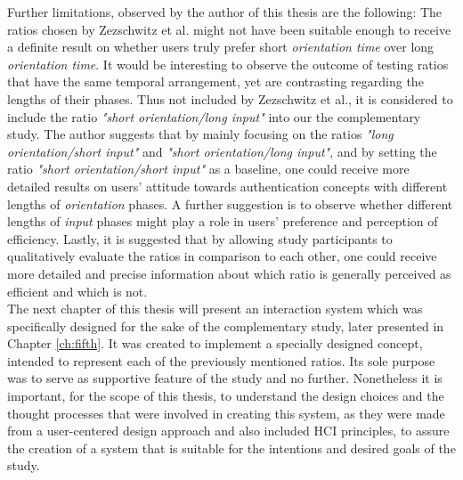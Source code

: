 Further limitations, observed by the author of this thesis are the following: The ratios chosen by Zezschwitz et al. \cite{Zezschwitz} might not have been suitable enough to receive a definite result on whether users truly prefer short \textit{orientation time} over long \textit{orientation time}. It would be interesting to observe the outcome of testing ratios that have the same temporal arrangement, yet are contrasting regarding the lengths of their phases. Thus not included by Zezschwitz et al., it is considered to include the ratio \textit{"short orientation/long input"} into our the complementary study. The author suggests that by mainly focusing on the ratios \textit{"long orientation/short input"} and \textit{"short orientation/long input"}, and by setting the ratio \textit{"short orientation/short input"} as a baseline, one could receive more detailed results on users' attitude towards authentication concepts with different lengths of \textit{orientation} phases. A further suggestion is to observe whether different lengths of \textit{input} phases might play a role in users' preference and perception of efficiency. Lastly, it is suggested that by allowing study participants to qualitatively evaluate the ratios in comparison to each other, one could receive more detailed and precise information about which ratio is generally perceived as efficient and which is not. \\

The next chapter of this thesis will present an interaction system which was specifically designed for the sake of the complementary study, later presented in Chapter \ref{ch:fifth}. It was created to implement a specially designed concept, intended to represent each of the previously mentioned ratios. Its sole purpose was to serve as  supportive feature of the study and no further. Nonetheless it is important, for the scope of this thesis, to understand the design choices and the thought processes that were involved in creating this system, as they were made from a user-centered design approach and also included HCI principles, to assure the creation of a system that is suitable for the intentions and desired goals of the study. 







